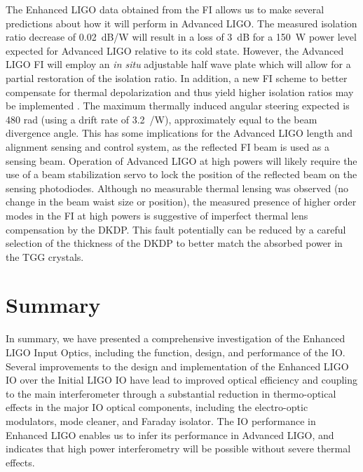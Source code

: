 The Enhanced LIGO data obtained from the FI allows us to make several
predictions about how it will perform in Advanced LIGO.  The measured
isolation ratio decrease of 0.02~dB/W will result in a loss of 3~dB
for a 150~W power level expected for Advanced LIGO relative to its
cold state.  However, the Advanced LIGO FI will employ an \emph{in
  situ} adjustable half wave plate which will allow for a partial
restoration of the isolation ratio. In addition, a new FI scheme to
better compensate for thermal depolarization and thus yield higher
isolation ratios may be implemented
\cite{Snetkov2011Compensation}. The maximum thermally induced angular
steering expected is 480 \micro rad (using a drift rate of
3.2~\microrad/W), approximately equal to the beam divergence
angle. This has some implications for the Advanced LIGO length and
alignment sensing and control system, as the reflected FI beam is used
as a sensing beam. Operation of Advanced LIGO at high powers will
likely require the use of a beam stabilization servo to lock the
position of the reflected beam on the sensing photodiodes.  Although
no measurable thermal lensing was observed (no change in the beam
waist size or position), the measured presence of higher order modes
in the FI at high powers is suggestive of imperfect thermal lens
compensation by the DKDP.  This fault potentially can be reduced by a
careful selection of the thickness of the DKDP to better match the
absorbed power in the TGG crystals.

\section{Summary}
\label{sec:summary}
In summary, we have presented a comprehensive investigation of the
Enhanced LIGO Input Optics, including the function, design, and
performance of the IO.  Several improvements to the design and
implementation of the Enhanced LIGO IO over the Initial LIGO IO have
lead to improved optical efficiency and coupling to the main
interferometer through a substantial reduction in thermo-optical
effects in the major IO optical components, including the
electro-optic modulators, mode cleaner, and Faraday isolator.  The IO
performance in Enhanced LIGO enables us to infer its performance in
Advanced LIGO, and indicates that high power interferometry will be
possible without severe thermal effects.



